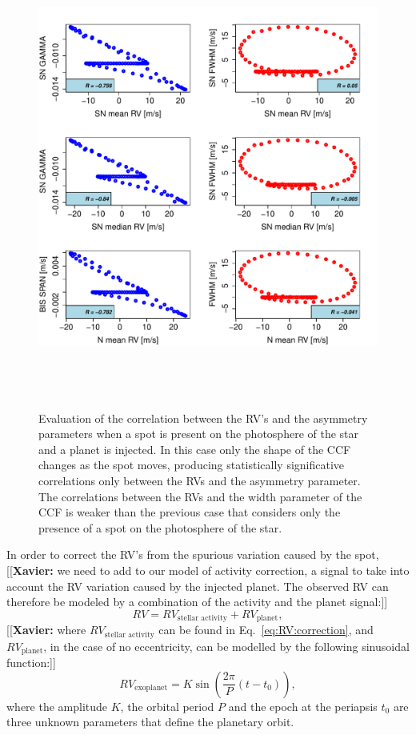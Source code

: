 \documentclass{aa}
\newcommand{\xavier}[1]{{\color{blue}[[\textbf{Xavier: }#1]]}}
\begin{document}
\begin{figure}[htbp]
\begin{center}
\includegraphics[height = 6in]{SOAP_SPOT_PLANET_Comparison_para_SN.pdf} 
   \caption{Evaluation of the correlation between the RV's and the asymmetry parameters when a spot is present on the photosphere of the star and a planet is injected.  In this case only the shape of the CCF changes as the spot moves, producing statistically significative correlations only between the RVs and the asymmetry parameter. The correlations between the RVs and the width parameter of the CCF is weaker than the previous case that considers only the presence of a spot on the photosphere of the star.}
    \label{fig:spot.plus.planet.corr}
\end{center}
\end{figure}

In order to correct the RV's from the spurious variation caused by the spot, \xavier{we need to add to our model of activity correction, a signal to take into account the RV variation caused by the injected planet. The observed RV can therefore be modeled by a combination of the activity and the planet signal:}
%
\begin{equation}
RV= RV_{\text{stellar activity}} + RV_{\text{planet}},
\label{eq:RV:correction.overall}
\end{equation}
%
\xavier{where $RV_{\text{stellar activity}}$ can be found in Eq.~\ref{eq:RV:correction}, and $RV_{\text{planet}}$, in the case of no eccentricity, can be modelled by the following sinusoidal function:}
%
\begin{equation}
RV_{\text{exoplanet}}= K \sin \left(\frac{2 \pi}{P} (t - t_{0})\right),
\label{eq:RV:correction.planet}
\end{equation}
%
where the amplitude $K$, the orbital period $P$ and the epoch at the periapsis $t_{0}$ are three unknown parameters that define the planetary orbit.
\end{document}
